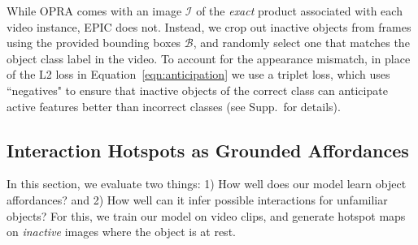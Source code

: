 \documentclass[10pt,twocolumn,letterpaper]{article}
\newcommand{\refeqn}[1]{Equation~\ref{#1}}
\begin{document}
While OPRA comes with an image $\mathcal{I}$ of the \emph{exact} product associated with each video instance, EPIC does not. Instead, we crop out inactive objects from frames using the provided bounding boxes $\mathcal{B}$, and randomly select one that matches the object class label in the video. To account for the appearance mismatch, in place of the L2 loss in \refeqn{eqn:anticipation} we use a triplet loss,
which uses ``negatives" to ensure that inactive objects of the correct class can anticipate active features better than incorrect classes (see Supp.~for details).












\subsection{Interaction Hotspots as Grounded Affordances} \label{sec:grounded-affordances}

In this section, we evaluate two things: 1) How well does our model learn object affordances? and 2) How well can it infer possible interactions for unfamiliar objects? For this, we train our model on video clips, and generate hotspot maps on \emph{inactive} images where the object is at rest.
\end{document}
